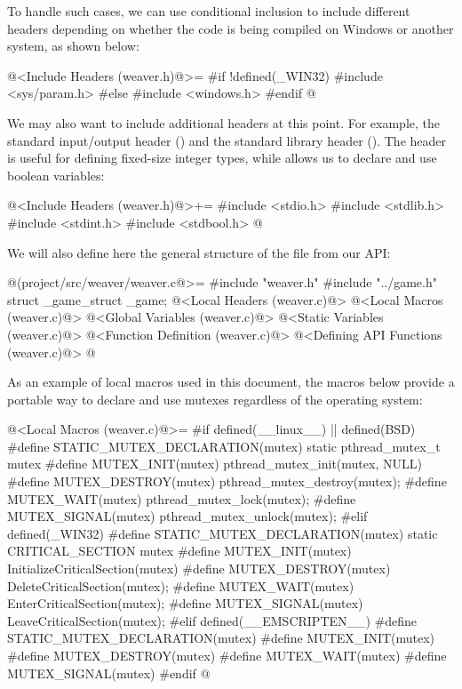 To handle such cases, we can use conditional inclusion to include
different headers depending on whether the code is being compiled on
Windows or another system, as shown below:

\iniciocodigo
@<Include Headers (weaver.h)@>=
#if !defined(_WIN32)
#include <sys/param.h>
#else
#include <windows.h>
#endif
@
\fimcodigo

We may also want to include additional headers at this point. For
example, the standard input/output header () and
the standard library header (). The
header  is useful for defining fixed-size integer
types, while  allows us to declare and use
boolean variables:

\iniciocodigo
@<Include Headers (weaver.h)@>+=
#include <stdio.h>
#include <stdlib.h>
#include <stdint.h>
#include <stdbool.h>
@
\fimcodigo

We will also define here the general structure of
the  file from our API:

\iniciocodigo
@(project/src/weaver/weaver.c@>=
#include "weaver.h"
#include "../game.h"
struct _game_struct _game;
@<Local Headers (weaver.c)@>
@<Local Macros (weaver.c)@>
@<Global Variables (weaver.c)@>
@<Static Variables (weaver.c)@>
@<Function Definition (weaver.c)@>
@<Defining API Functions (weaver.c)@>
@
\fimcodigo

As an example of local macros used in this document, the macros below
provide a portable way to declare and use mutexes regardless of the
operating system:

\iniciocodigo
@<Local Macros (weaver.c)@>=
#if defined(__linux__) || defined(BSD)
#define STATIC_MUTEX_DECLARATION(mutex) static pthread_mutex_t mutex
#define MUTEX_INIT(mutex) pthread_mutex_init(mutex, NULL)
#define MUTEX_DESTROY(mutex) pthread_mutex_destroy(mutex);
#define MUTEX_WAIT(mutex) pthread_mutex_lock(mutex);
#define MUTEX_SIGNAL(mutex) pthread_mutex_unlock(mutex);
#elif defined(_WIN32)
#define STATIC_MUTEX_DECLARATION(mutex) static CRITICAL_SECTION mutex
#define MUTEX_INIT(mutex) InitializeCriticalSection(mutex)
#define MUTEX_DESTROY(mutex) DeleteCriticalSection(mutex);
#define MUTEX_WAIT(mutex) EnterCriticalSection(mutex);
#define MUTEX_SIGNAL(mutex) LeaveCriticalSection(mutex);
#elif defined(__EMSCRIPTEN__)
#define STATIC_MUTEX_DECLARATION(mutex)
#define MUTEX_INIT(mutex)
#define MUTEX_DESTROY(mutex)
#define MUTEX_WAIT(mutex)
#define MUTEX_SIGNAL(mutex)
#endif
@
\fimcodigo

